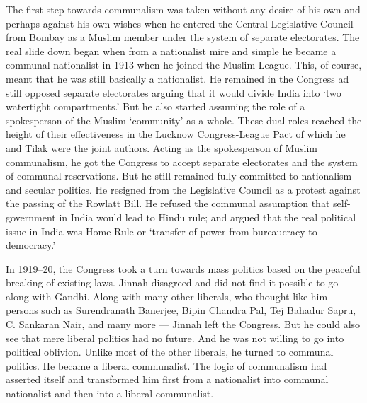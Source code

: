 \begin{multicols}{2}
The first step towards communalism was taken without any desire of his own and perhaps against his own wishes when he entered the Central Legislative Council from Bombay as a Muslim member under the system of separate electorates. The real slide down began when from a nationalist mire and simple he became a communal nationalist in 1913 when he joined the Muslim League. This, of course, meant that he was still basically a nationalist. He remained in the Congress ad still opposed separate electorates arguing that it would divide India into `two watertight compartments.' But he also started assuming the role of a spokesperson of the Muslim `community' as a whole. These dual roles reached the height of their effectiveness in the Lucknow Congress-League Pact of which he and Tilak were the joint authors. Acting as the spokesperson of Muslim communalism, he got the Congress to accept separate electorates and the system of communal reservations. But he still remained fully committed to nationalism and secular politics. He resigned from the Legislative Council as a protest against the passing of the Rowlatt Bill. He refused the communal assumption that self- government in India would lead to Hindu rule; and argued that the real political issue in India was Home Rule or `transfer of power from bureaucracy to democracy.' 

In 1919--20, the Congress took a turn towards mass politics based on the peaceful breaking of existing laws. Jinnah disagreed and did not find it possible to go along with Gandhi. Along with many other liberals, who thought like him --- persons such as Surendranath Banerjee, Bipin Chandra Pal, Tej Bahadur Sapru, C. Sankaran Nair, and many more --- Jinnah left the Congress. But he could also see that mere liberal politics had no future. And he was not willing to go into political oblivion. Unlike most of the other liberals, he turned to communal politics. He became a liberal communalist. The logic of communalism had asserted itself and transformed him first from a nationalist into communal nationalist and then into a liberal communalist. 


\end{multicols}
